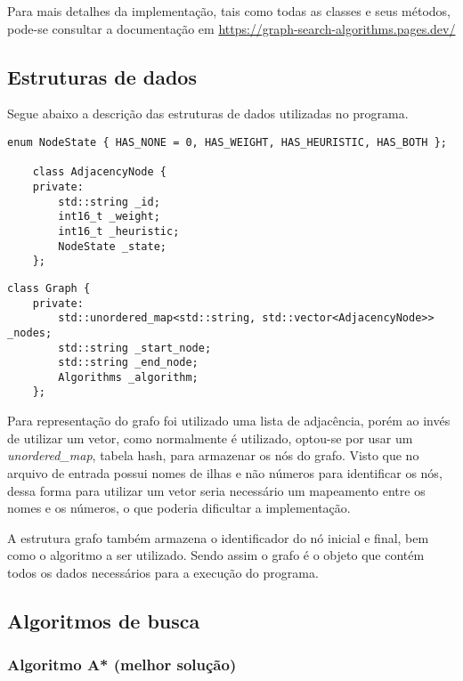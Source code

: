 \documentclass[12pt, a4paper]{article}
\begin{document}
Para mais detalhes da implementação, tais como todas as classes e seus métodos,
pode-se consultar a documentação em \url{https://graph-search-algorithms.pages.dev/}

\subsection{Estruturas de dados}\label{sec:estruturas}
Segue abaixo a descrição das estruturas de dados utilizadas no programa.

\begin{lstlisting}[caption={Estrutura de dados para representar um nó do grafo.}, label={lst:node}]
    enum NodeState { HAS_NONE = 0, HAS_WEIGHT, HAS_HEURISTIC, HAS_BOTH };

    class AdjacencyNode {
    private:
        std::string _id;
        int16_t _weight;
        int16_t _heuristic;
        NodeState _state;
    };
\end{lstlisting}

\begin{lstlisting}[caption={Estrutura de dados para representar o grafo.}, label={lst:graph}]
    class Graph {
    private:
        std::unordered_map<std::string, std::vector<AdjacencyNode>> _nodes;
        std::string _start_node;
        std::string _end_node;
        Algorithms _algorithm;
    };
\end{lstlisting}

Para representação do grafo foi utilizado uma lista de adjacência,
porém ao invés de utilizar um vetor, como normalmente é utilizado,
optou-se por usar um \textit{unordered\_map}, tabela hash, para armazenar os nós do grafo.
Visto que no arquivo de entrada possui nomes de ilhas e não números para identificar os nós,
dessa forma para utilizar um vetor seria necessário um mapeamento entre os nomes e os números,
o que poderia dificultar a implementação.

A estrutura grafo também armazena o identificador do nó inicial e final,
bem como o algoritmo a ser utilizado.
Sendo assim o grafo é o objeto que contém todos os dados necessários para a execução do programa.

\subsection{Algoritmos de busca}\label{sec:algoritmos}
\subsubsection{Algoritmo A* (melhor solução)}\label{sec:astar}
\end{document}
